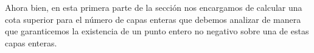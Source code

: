 
Ahora bien, en esta primera parte de la sección nos encargamos de calcular una cota superior para el
número de capas enteras que debemos analizar de manera que garanticemos la existencia de un punto
entero no negativo sobre una de estas capas enteras.


